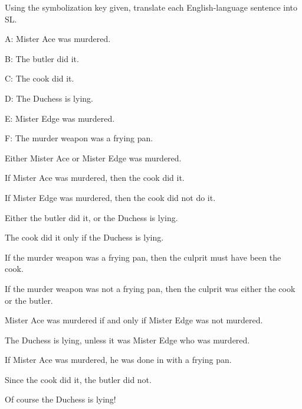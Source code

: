 \problempart Using the symbolization key given, translate each English-language sentence into SL.
\begin{ekey}
\item[A:] Mister Ace was murdered.
\item[B:] The butler did it.
\item[C:] The cook did it.
\item[D:] The Duchess is lying.
\item[E:] Mister Edge was murdered.
\item[F:] The murder weapon was a frying pan.
\end{ekey}
\begin{earg}
\item Either Mister Ace or Mister Edge was murdered.
\item If Mister Ace was murdered, then the cook did it.
\item If Mister Edge was murdered, then the cook did not do it.
\item Either the butler did it, or the Duchess is lying.
\item The cook did it only if the Duchess is lying.
\item If the murder weapon was a frying pan, then the culprit must have been the cook.
\item If the murder weapon was not a frying pan, then the culprit was either the cook or the butler.
\item Mister Ace was murdered if and only if Mister Edge was not murdered.
\item The Duchess is lying, unless it was Mister Edge who was murdered.
\item If Mister Ace was murdered, he was done in with a frying pan.
\item Since the cook did it, the butler did not.
\item Of course the Duchess is lying!
\end{earg}



